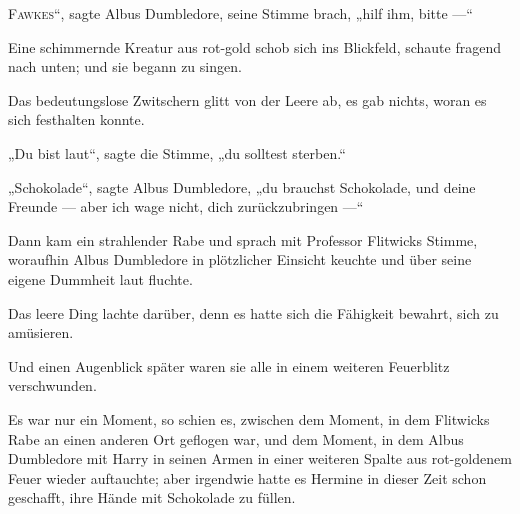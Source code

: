 
\lettrine[ante=„]{F}{awkes}“, sagte Albus Dumbledore, seine Stimme brach, „hilf ihm, bitte —“

Eine schimmernde Kreatur aus rot-gold schob sich ins Blickfeld, schaute fragend nach unten; und sie begann zu singen.

Das bedeutungslose Zwitschern glitt von der Leere ab, es gab nichts, woran es sich festhalten konnte.

„Du bist laut“, sagte die Stimme, „du solltest sterben.“

„Schokolade“, sagte Albus Dumbledore, „du brauchst Schokolade, und deine Freunde — aber ich wage nicht, dich zurückzubringen —“

Dann kam ein strahlender Rabe und sprach mit Professor Flitwicks Stimme, woraufhin Albus Dumbledore in plötzlicher Einsicht keuchte und über seine eigene Dummheit laut fluchte.

Das leere Ding lachte darüber, denn es hatte sich die Fähigkeit bewahrt, sich zu amüsieren.

Und einen Augenblick später waren sie alle in einem weiteren Feuerblitz verschwunden.

\later

Es war nur ein Moment, so schien es, zwischen dem Moment, in dem Flitwicks Rabe an einen anderen Ort geflogen war, und dem Moment, in dem Albus Dumbledore mit Harry in seinen Armen in einer weiteren Spalte aus rot-goldenem Feuer wieder auftauchte; aber irgendwie hatte es Hermine in dieser Zeit schon geschafft, ihre Hände mit Schokolade zu füllen.

